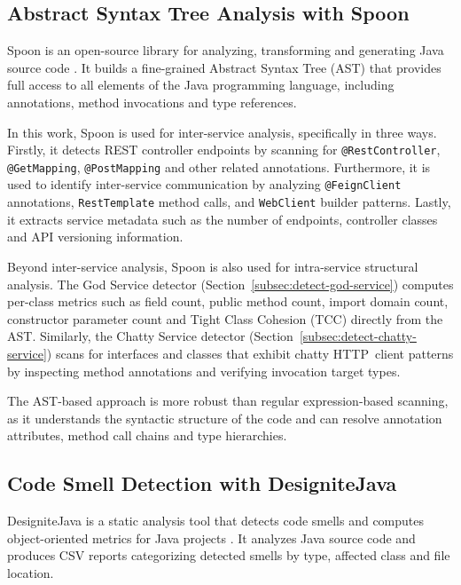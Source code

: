 \subsection{Abstract Syntax Tree Analysis with Spoon}
\label{subsec:spoon-analysis}

\par Spoon is an open-source library for analyzing, transforming and generating Java source code \cite{Pawlak2016}. It builds a fine-grained Abstract Syntax Tree (AST) that provides full access to all elements of the Java programming language, including annotations, method invocations and type references.

In this work, Spoon is used for inter-service analysis, specifically in three ways. Firstly, it detects REST controller endpoints by scanning for \texttt{@RestController}, \texttt{@GetMapping}, \texttt{@PostMapping} and other related annotations. Furthermore, it is used to identify inter-service communication by analyzing \texttt{@FeignClient} annotations, \texttt{RestTemplate} method calls, and \texttt{WebClient} builder patterns. Lastly, it extracts service metadata such as the number of endpoints, controller classes and API versioning information.

Beyond inter-service analysis, Spoon is also used for intra-service structural analysis. The God Service detector (Section~\ref{subsec:detect-god-service}) computes per-class metrics such as field count, public method count, import domain count, constructor parameter count and Tight Class Cohesion (TCC) directly from the AST. Similarly, the Chatty Service detector (Section~\ref{subsec:detect-chatty-service}) scans for interfaces and classes that exhibit chatty HTTP~client patterns by inspecting method annotations and verifying invocation target types.

The AST-based approach is more robust than regular expression-based scanning, as it understands the syntactic structure of the code and can resolve annotation attributes, method call chains and type hierarchies.

\subsection{Code Smell Detection with DesigniteJava}
\label{subsec:designite-analysis}

\par DesigniteJava is a static analysis tool that detects code smells and computes object-oriented metrics for Java projects \cite{Sharma2024}. It analyzes Java source code and produces CSV reports categorizing detected smells by type, affected class and file location.

